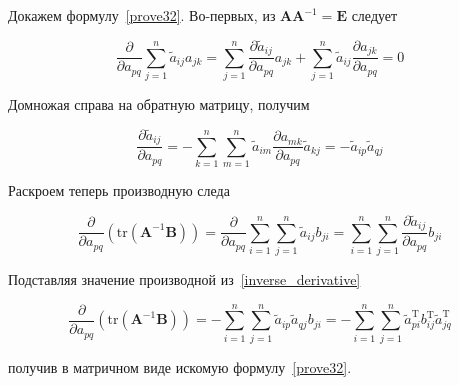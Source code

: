 	Докажем формулу~\eqref{prove32}. Во-первых, из $\mathbf{A}\mathbf{A}^{-1} = \mathbf{E}$ следует
	
	\begin{equation}
	\frac{\partial}{\partial a_{pq}} \sum\limits_{j=1}^{n} \tilde{a}_{ij} a_{jk} =  \sum\limits_{j=1}^{n} \frac{\partial \tilde{a}_{ij}}{\partial a_{pq}} a_{jk} + \sum\limits_{j=1}^{n} \tilde{a}_{ij}  \frac{\partial a_{jk}}{\partial a_{pq}} = 0
	\end{equation}
	
	Домножая справа на обратную матрицу, получим
	
	\begin{equation}
	\label{inverse_derivative}
	\frac{\partial \tilde{a}_{ij}}{\partial a_{pq}} = - \sum\limits_{k=1}^{n} \sum\limits_{m=1}^{n} \tilde{a}_{im}  \frac{\partial a_{mk}}{\partial a_{pq}} \tilde{a}_{kj}  = - \tilde{a}_{ip}  \tilde{a}_{qj} 
	\end{equation}
	
	Раскроем теперь производную следа
	
	\begin{equation}
	\frac{\partial}{\partial a_{pq}}(\text{tr}(\mathbf{A}^{-1}\mathbf{B})) = \frac{\partial}{\partial a_{pq}} \sum\limits_{i=1}^{n} \sum\limits_{j=1}^{n} \tilde{a}_{ij} b_{ji} = \sum\limits_{i=1}^{n} \sum\limits_{j=1}^{n} \frac{\partial \tilde{a}_{ij}}{\partial a_{pq}} b_{ji}
	\end{equation}
	
	Подставляя значение производной из~\eqref{inverse_derivative}
	
	\begin{equation}
	\frac{\partial}{\partial a_{pq}}(\text{tr}(\mathbf{A}^{-1}\mathbf{B})) = - \sum\limits_{i=1}^{n} \sum\limits_{j=1}^{n} \tilde{a}_{ip}  \tilde{a}_{qj}  b_{ji} =  - \sum\limits_{i=1}^{n} \sum\limits_{j=1}^{n} \tilde{a}_{pi}^\text{T} b_{ij}^\text{T}  \tilde{a}_{jq}^\text{T} 
	\end{equation}
	
	получив в матричном виде искомую формулу~\eqref{prove32}.
	\section{}
	
	\subsection{}

	\subsection{}
	
